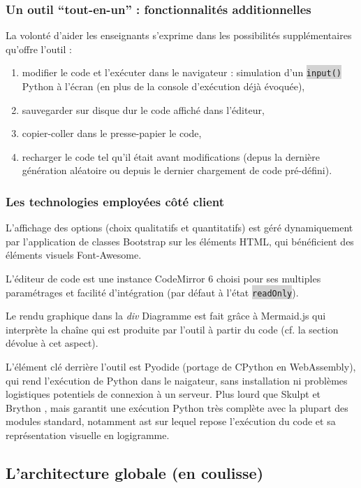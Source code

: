 \documentclass[11pt,a4paper]{article}
\newcommand{\code}[1]{\colorbox{lightgray}{\texttt{\small #1}}}
\begin{document}
\subsubsection{Un outil ``tout-en-un'' : fonctionnalités additionnelles}
La volonté d'aider les enseignants s'exprime dans les possibilités supplémentaires qu'offre l'outil : \begin{enumerate} 
    \item modifier le code et l'exécuter dans le navigateur : simulation d'un \code{input()} Python à l'écran (en plus de la console d'exécution déjà évoquée),
    \item sauvegarder sur disque dur le code affiché dans l'éditeur, 
    \item copier-coller dans le presse-papier le code,
    \item recharger le code tel qu'il était avant modifications (depus la dernière génération aléatoire ou depuis le dernier chargement de code pré-défini).
\end{enumerate}
\subsubsection{Les technologies employées côté client}
L'affichage des options (choix qualitatifs et quantitatifs) est géré dynamiquement par l'application de classes Bootstrap sur les éléments HTML, qui bénéficient des éléments visuels Font-Awesome.\par
L'éditeur de code est une instance CodeMirror 6 \cite{codemirror6} choisi pour ses multiples paramétrages et facilité d'intégration (par défaut à l'état \code{readOnly}). \par Le rendu graphique dans la \textit{div} Diagramme est fait grâce à  Mermaid.js qui interprète la chaîne qui est produite par l'outil à partir du code (cf. la section dévolue à cet aspect). \par L'élément clé derrière l'outil est Pyodide (portage de CPython en WebAssembly), qui rend l'exécution de Python dans le naigateur, sans installation ni problèmes logistiques potentiels de connexion à un serveur. Plus lourd que Skulpt \cite{skulpt} et Brython \cite{brython}, mais garantit une exécution Python très complète avec la plupart des modules standard, notamment ast sur lequel repose l'exécution du code et sa représentation visuelle en logigramme.

\subsection{L'architecture globale (en coulisse)}
\end{document}
